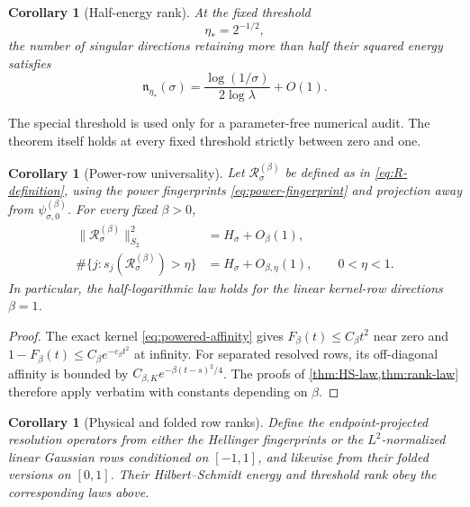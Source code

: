 \documentclass[11pt]{article}
\newtheorem{corollary}[theorem]{Corollary}
\theoremstyle{definition}
\theoremstyle{remark}
\newcommand{\cR}{\mathcal R}
\begin{document}
\begin{corollary}[Half-energy rank]
\label{cor:half-energy}
At the fixed threshold
\begin{equation}\label{eq:half-energy-threshold}
 \eta_*=2^{-1/2},
\end{equation}
the number of singular directions retaining more than half their squared
energy satisfies
\begin{equation}\label{eq:half-energy-law}
 \mathfrak n_{\eta_*}(\sigma)
 =\frac{\log(1/\sigma)}{2\log\lambda}+O(1).
\end{equation}
\end{corollary}

The special threshold is used only for a parameter-free numerical audit.  The
theorem itself holds at every fixed threshold strictly between zero and one.

\begin{corollary}[Power-row universality]
\label{cor:power-universality}
Let $\cR_\sigma^{(\beta)}$ be defined as in
\eqref{eq:R-definition}, using the power fingerprints
\eqref{eq:power-fingerprint} and projection away from
$\psi^{(\beta)}_{\sigma,0}$.  For every fixed $\beta>0$,
\begin{align}
 \|\cR_\sigma^{(\beta)}\|_{S_2}^2
 &=H_\sigma+O_\beta(1),
 \label{eq:power-HS-law}\\
 \#\{j:s_j(\cR_\sigma^{(\beta)})>\eta\}
 &=H_\sigma+O_{\beta,\eta}(1),
 \qquad 0<\eta<1.
 \label{eq:power-rank-law}
\end{align}
In particular, the half-logarithmic law holds for the linear kernel-row
directions $\beta=1$.
\end{corollary}

\begin{proof}
The exact kernel \eqref{eq:powered-affinity} gives
$F_\beta(t)\le C_\beta t^2$ near zero and
$1-F_\beta(t)\le C_\beta e^{-c_\beta t^2}$ at infinity.  For separated
resolved rows, its off-diagonal affinity is bounded by
$C_{\beta,K}e^{-\beta(t-s)^2/4}$.  The proofs of
\cref{thm:HS-law,thm:rank-law} therefore apply verbatim with constants
depending on $\beta$.
\end{proof}

\begin{corollary}[Physical and folded row ranks]
\label{cor:physical-rank}
Define the endpoint-projected resolution operators from either the Hellinger
fingerprints or the $L^2$-normalized linear Gaussian rows conditioned on
$[-1,1]$, and likewise from their folded versions on $[0,1]$.  Their
Hilbert--Schmidt energy and threshold rank obey the corresponding laws above.
\end{corollary}
\end{document}
